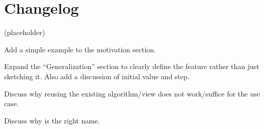 \section{Changelog}
(placeholder)
\begin{revision}
\item Add a simple example to the motivation section.
\item Expand the “Generalization” section to clearly define the feature rather
  than just sketching it.
  Also add a discussion of initial value and step.
\item Discuss why reusing the existing  algorithm/view does not
  work/suffice for the  use case.
\item Discuss why  is the right name.
\end{revision}
